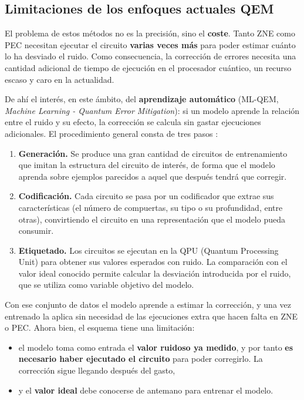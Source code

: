 \subsection{Limitaciones de los enfoques actuales QEM}
\label{sec:limitaciones}

El problema de estos métodos no es la precisión, sino el \textbf{coste}. Tanto ZNE como PEC
necesitan ejecutar el circuito \textbf{varias veces más} para poder estimar cuánto lo ha desviado el ruido. Como consecuencia, 
la corrección de errores necesita una 
cantidad adicional de tiempo de ejecución en el procesador cuántico, un recurso escaso y caro en la actualidad.

De ahí el interés, en este ámbito, del \textbf{aprendizaje automático} (ML-QEM, \textit{Machine Learning - Quantum Error Mitigation}): si un modelo aprende la relación entre el ruido y su efecto, la corrección se calcula sin gastar ejecuciones adicionales. El procedimiento general consta de tres pasos \cite{liao2024machine}:

\begin{enumerate}
      \item \textbf{Generación.} Se produce una gran cantidad de circuitos de entrenamiento
          que imitan la estructura del circuito de interés, de forma que el modelo aprenda
          sobre ejemplos parecidos a aquel que después tendrá que corregir.
      \item \textbf{Codificación.} Cada circuito se pasa por un codificador que extrae sus
          características (el número de compuertas, su tipo o su profundidad, entre otras),
          convirtiendo el circuito en una representación que el modelo pueda consumir.
      \item \textbf{Etiquetado.} Los circuitos se ejecutan en la QPU (Quantum Processing Unit) para obtener sus valores esperados con ruido. La comparación con el valor ideal conocido permite calcular la desviación introducida por el ruido, que se utiliza como variable objetivo del modelo.
\end{enumerate}

Con ese conjunto de datos el modelo aprende a estimar la corrección, y una vez entrenado la
aplica sin necesidad de las ejecuciones extra que hacen falta en ZNE o PEC. Ahora bien, el esquema
tiene una limitación: 

\begin{itemize}
      \item el modelo toma como entrada el \textbf{valor ruidoso ya medido}, y por tanto \textbf{es necesario haber ejecutado el circuito} para poder corregirlo. La corrección sigue llegando después del gasto,
      \item y el \textbf{valor ideal} debe conocerse de antemano para entrenar el modelo.
\end{itemize}

